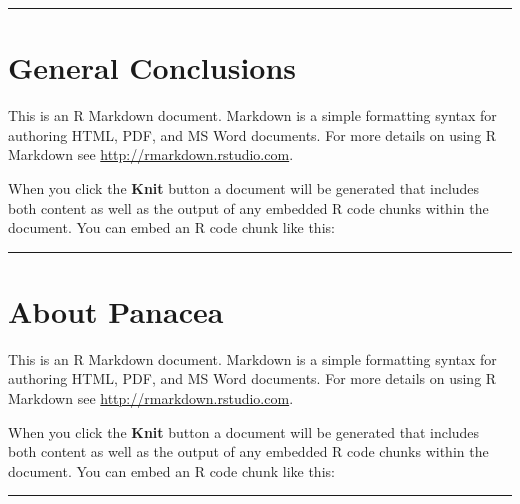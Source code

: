 \documentclass[]{article}
\begin{document}
\begin{center}\rule{0.5\linewidth}{\linethickness}\end{center}

\section{General Conclusions}\label{general-conclusions}

This is an R Markdown document. Markdown is a simple formatting syntax
for authoring HTML, PDF, and MS Word documents. For more details on
using R Markdown see \url{http://rmarkdown.rstudio.com}.

When you click the \textbf{Knit} button a document will be generated
that includes both content as well as the output of any embedded R code
chunks within the document. You can embed an R code chunk like this:

\begin{center}\rule{0.5\linewidth}{\linethickness}\end{center}

\section{About Panacea}\label{about-panacea}

This is an R Markdown document. Markdown is a simple formatting syntax
for authoring HTML, PDF, and MS Word documents. For more details on
using R Markdown see \url{http://rmarkdown.rstudio.com}.

When you click the \textbf{Knit} button a document will be generated
that includes both content as well as the output of any embedded R code
chunks within the document. You can embed an R code chunk like this:

\begin{center}\rule{0.5\linewidth}{\linethickness}\end{center}
\end{document}
